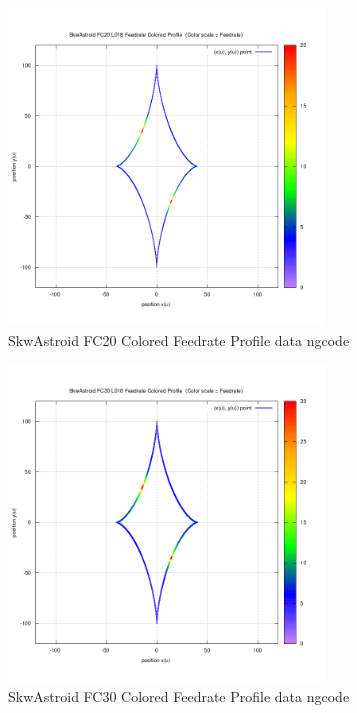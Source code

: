 \begin{figure}
	\caption     {SkwAstroid FC20 Colored Feedrate Profile data ngcode}
	\label{18-img-SkwAstroid-FC20-Colored-Feedrate-Profile-data_ngcode.png}
	\includegraphics[width=0.75\textwidth]{Chap4/appendix/app-SkwAstroid/plots/18-img-SkwAstroid-FC20-Colored-Feedrate-Profile-data_ngcode.png}
\end{figure}

\clearpage
\pagebreak

\begin{figure}
	\caption     {SkwAstroid FC30 Colored Feedrate Profile data ngcode}
	\label{19-img-SkwAstroid-FC30-Colored-Feedrate-Profile-data_ngcode.png}
	\includegraphics[width=0.75\textwidth]{Chap4/appendix/app-SkwAstroid/plots/19-img-SkwAstroid-FC30-Colored-Feedrate-Profile-data_ngcode.png}
\end{figure}


